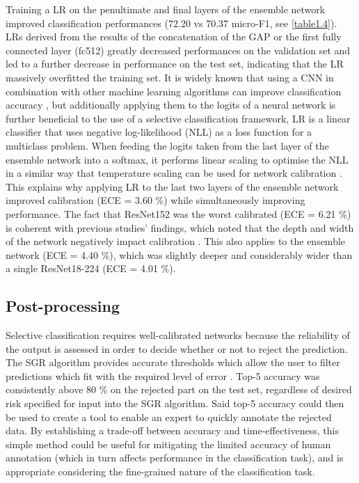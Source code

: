 Training a LR on the penultimate and final layers of the ensemble network improved classification performances (72.20 vs 70.37 micro-F1, see \autoref{table1.4}). LRs derived from the results of the concatenation of the GAP or the first fully connected layer (fc512) greatly decreased performances on the validation set and led to a further decrease in performance on the test set, indicating that the LR massively overfitted the training set. It is widely known that using a CNN in combination with other machine learning algorithms can improve classification accuracy \citep{donahue_decaf:_2014, gao_combining_2017, huang_densely_2017, li_visual_2016}, but additionally applying them to the logits of a neural network is further beneficial to the use of a selective classification framework, LR is a linear classifier that uses negative log-likelihood (NLL) as a loss function for a multiclass problem. When feeding the logits taken from the last layer of the ensemble network into a softmax, it performs linear scaling to optimise the NLL in a similar way that temperature scaling can be used for network calibration \citep{guo_calibration_2017}. This explains why applying LR to the last two layers of the ensemble network improved calibration (ECE = 3.60 \%) while simultaneously improving performance. The fact that ResNet152 was the worst calibrated (ECE = 6.21 \%) is coherent with previous studies’ findings, which noted that the depth and width of the network negatively impact calibration \citep{guo_calibration_2017}. This also applies to the ensemble network (ECE = 4.40 \%), which was slightly deeper and considerably wider than a single ResNet18-224 (ECE = 4.01 \%).

\subsection{Post-processing}\label{chapitre1_7.3}
Selective classification requires well-calibrated networks because the reliability of the output is assessed in order to decide whether or not to reject the prediction. The SGR algorithm provides accurate thresholds which allow the user to filter predictions which fit with the required level of error \citep{geifman_selective_2017}. Top-5 accuracy was consistently above 80 \% on the rejected part on the test set, regardless of desired risk specified for input into the SGR algorithm. Said top-5 accuracy could then be used to create a tool to enable an expert to quickly annotate the rejected data. By establishing a trade-off between accuracy and time-effectiveness, this simple method could be useful for mitigating the limited accuracy of human annotation (which in turn affects performance in the classification task), and is appropriate considering the fine-grained nature of the classification task.

